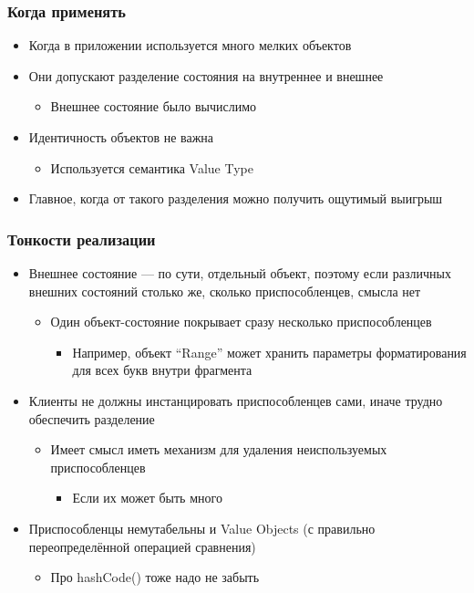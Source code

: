 \documentclass{../cscslides}
\begin{document}
    \begin{frame}
        \frametitle{Когда применять}
        \begin{itemize}
            \item Когда в приложении используется много мелких объектов
            \item Они допускают разделение состояния на внутреннее и внешнее
            \begin{itemize}
                \item Внешнее состояние было вычислимо
            \end{itemize}
            \item Идентичность объектов не важна
            \begin{itemize}
                \item Используется семантика Value Type
            \end{itemize}
            \item Главное, когда от такого разделения можно получить ощутимый выигрыш
        \end{itemize}
    \end{frame}

    \begin{frame}
        \frametitle{Тонкости реализации}
        \begin{itemize}
            \item Внешнее состояние --- по сути, отдельный объект, поэтому если различных внешних состояний столько же, сколько приспособленцев, смысла нет
            \begin{itemize}
                \item Один объект-состояние покрывает сразу несколько приспособленцев
                \begin{itemize}
                    \item Например, объект ``Range'' может хранить параметры форматирования для всех букв внутри фрагмента
                \end{itemize}
            \end{itemize}
            \item Клиенты не должны инстанцировать приспособленцев сами, иначе трудно обеспечить разделение
            \begin{itemize}
                \item Имеет смысл иметь механизм для удаления неиспользуемых приспособленцев
                \begin{itemize}
                    \item Если их может быть много
                \end{itemize}
            \end{itemize}
            \item Приспособленцы немутабельны и Value Objects (с правильно переопределённой операцией сравнения)
            \begin{itemize}
                \item Про hashCode() тоже надо не забыть
            \end{itemize}
        \end{itemize}
    \end{frame}
\end{document}
